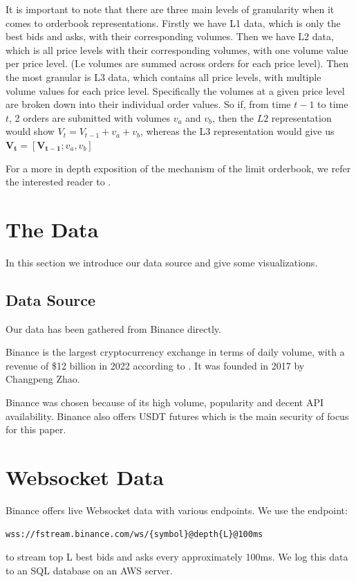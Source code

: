 \documentclass[a4paper, oneside, notitlepage]{book}
\begin{document}
It is important to note that there are three main levels of granularity 
when it comes to orderbook representations.
Firstly we have L1 data, which is only the best bids and asks, with their corresponding volumes.
Then we have L2 data, which is all price levels with their corresponding volumes, with one volume value
per price level. (I.e volumes are summed across orders for each price level). Then the most granular is L3 data,
which contains all price levels, with multiple volume values for each price level. Specifically the volumes at a given price
level are broken down into their individual order values. So if, from time $t-1$ to time $t$, 2 orders
are submitted with volumes $v_a$ and $v_b$, then the $L2$ representation would show $V_t = V_{t-1} + v_a + v_b$,
whereas the L3 representation would give us  $\bm{V_t} = [\bm{V_{t-1}}; v_a, v_b]$

For a more in depth exposition of the mechanism of the limit orderbook, we refer the interested reader to \cite{MARTIN2013}.


\section{The Data}
In this section we introduce our data source and give some visualizations.

\subsection{Data Source}

Our data has been gathered from Binance directly.

Binance is the largest cryptocurrency exchange in terms of daily volume, with a revenue of \$12 billion in 2022 according to \cite{TULLY2023}. 
It was founded in 2017 by Changpeng Zhao. %

Binance was chosen because of its high volume, popularity and decent API availability.
Binance also offers USDT futures which is the main security of focus for this paper.

\section{Websocket Data}
Binance offers live Websocket data with various endpoints. 
We use the endpoint: \begin{verbatim}wss://fstream.binance.com/ws/{symbol}@depth{L}@100ms\end{verbatim} 
to stream top L best bids and asks every approximately 100ms.
We log this data to an SQL database on an AWS server.
\end{document}
